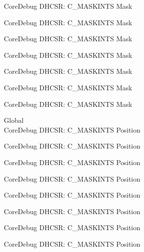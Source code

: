 \begin{DoxyRefList}
\label{deprecated__deprecated000800}%
%
Core\+Debug DHCSR\+: C\+\_\+\+MASKINTS Mask 

\label{deprecated__deprecated000856}%
%
Core\+Debug DHCSR\+: C\+\_\+\+MASKINTS Mask 

\label{deprecated__deprecated000939}%
%
Core\+Debug DHCSR\+: C\+\_\+\+MASKINTS Mask 

\label{deprecated__deprecated000998}%
%
Core\+Debug DHCSR\+: C\+\_\+\+MASKINTS Mask 

\label{deprecated__deprecated001074}%
%
Core\+Debug DHCSR\+: C\+\_\+\+MASKINTS Mask 

\label{deprecated__deprecated001163}%
%
Core\+Debug DHCSR\+: C\+\_\+\+MASKINTS Mask 

\label{deprecated__deprecated001265}%
%
Core\+Debug DHCSR\+: C\+\_\+\+MASKINTS Mask  
\item[Global \doxylink{group___c_m_s_i_s___core_debug_ga0d2907400eb948a4ea3886ca083ec8e3}{Core\+Debug\+\_\+\+DHCSR\+\_\+\+C\+\_\+\+MASKINTS\+\_\+\+Pos} ]\hfill \\
\label{deprecated__deprecated000033}%
%
Core\+Debug DHCSR\+: C\+\_\+\+MASKINTS Position 

\label{deprecated__deprecated000121}%
%
Core\+Debug DHCSR\+: C\+\_\+\+MASKINTS Position 

\label{deprecated__deprecated000177}%
%
Core\+Debug DHCSR\+: C\+\_\+\+MASKINTS Position 

\label{deprecated__deprecated000260}%
%
Core\+Debug DHCSR\+: C\+\_\+\+MASKINTS Position 

\label{deprecated__deprecated000319}%
%
Core\+Debug DHCSR\+: C\+\_\+\+MASKINTS Position 

\label{deprecated__deprecated000395}%
%
Core\+Debug DHCSR\+: C\+\_\+\+MASKINTS Position 

\label{deprecated__deprecated000484}%
%
Core\+Debug DHCSR\+: C\+\_\+\+MASKINTS Position 

\label{deprecated__deprecated000586}%
%
Core\+Debug DHCSR\+: C\+\_\+\+MASKINTS Position 


\end{DoxyRefList}
